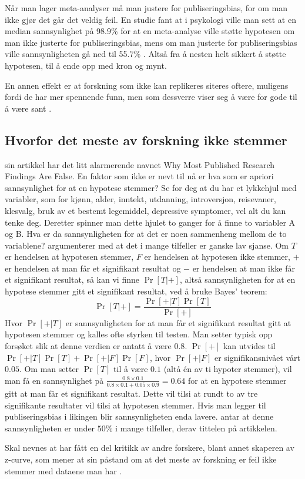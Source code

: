 \documentclass[doc,norsk]{apa7}
\begin{document}
Når man lager meta-analyser må man justere for publiseringsbias, for om man ikke gjør det går det veldig feil. En studie fant at i psykologi ville man sett at en median sannsynlighet på 98.9\% for at en meta-analyse ville støtte hypotesen om man ikke justerte for publiseringsbias, mens om man justerte for publiseringsbias ville sannsynligheten gå ned til 55.7\% \parencite{publiseringsbias-psykologi}. Altså fra å nesten helt sikkert å støtte hypotesen, til å ende opp med kron og mynt.

En annen effekt er at forskning som ikke kan replikeres siteres oftere, muligens fordi de har mer spennende funn, men som dessverre viser seg å være for gode til å være sant \parencite{falsk-sitert-mer}.

\subsection{Hvorfor det meste av forskning ikke stemmer}
\textcite{forskning-fake} sin artikkel har det litt alarmerende navnet \guillemetleft Why Most Published Research Findings Are False\guillemetright. En faktor som ikke er nevt til nå er hva som er apriori sannsynlighet for at en hypotese stemmer? Se for deg at du har et lykkehjul med variabler, som for kjønn, alder, inntekt, utdanning, introversjon, reisevaner, klesvalg, bruk av et bestemt legemiddel, depressive symptomer, vel alt du kan tenke deg. Deretter spinner man dette hjulet to ganger for å finne to variabler A og B. Hva er da sannsynligheten for at det er noen sammenheng mellom de to variablene? \textcite{forskning-fake} argumenterer med at det i mange tilfeller er ganske lav sjanse.
Om $T$ er hendelsen at hypotesen stemmer, $F$ er hendelsen at hypotesen ikke stemmer, $+$ er hendelsen at man får et signifikant resultat og $-$ er hendelsen at man ikke får et signifikant resultat, så kan vi finne $\Pr[T|+]$, altså sannsynligheten for at en hypotese stemmer gitt et signifikant resultat, ved å bruke Bayes' teorem:
\begin{equation}
\Pr[T|+] = \frac{\Pr[+|T]\Pr[T]}{\Pr[+]}
\end{equation}
Hvor $\Pr[+|T]$ er sannsynligheten for at man får et signifikant resultat gitt at hypotesen stemmer og kalles ofte styrken til testen. Man setter typisk opp forsøket slik at denne verdien er antatt å være $0.8$. $\Pr[+]$ kan utvides til $\Pr[+|T]\Pr[T] + \Pr[+|F]\Pr[F]$, hvor $\Pr[+|F]$ er signifikansnivået vårt $0.05$. Om man setter $\Pr[T]$ til å være $0.1$ (altå én av ti hypoter stemmer), vil man få en sannsynlighet på $\frac{0.8\times 0.1}{0.8\times 0.1 + 0.05\times 0.9} = 0.64$ for at en hypotese stemmer gitt at man får et signifikant resultat. Dette vil tilsi at rundt to av tre signifikante resultater vil tilsi at hypotesen stemmer. Hvis man legger til publiseringsbias i likingen blir sannsynligheten enda lavere. \textcite{forskning-fake} antar at denne sannsynligheten er under $50\%$ i mange tilfeller, derav tittelen på artikkelen.

Skal nevnes at \textcite{forskning-fake} har fått en del kritikk av andre forskere, blant annet skaperen av z-curve, som mener at \citeauthor{forskning-fake} sin påstand om at det meste av forskning er feil ikke stemmer med dataene man har \parencite{forskning-fake-kritikk}.

\printbibliography
\end{document}
